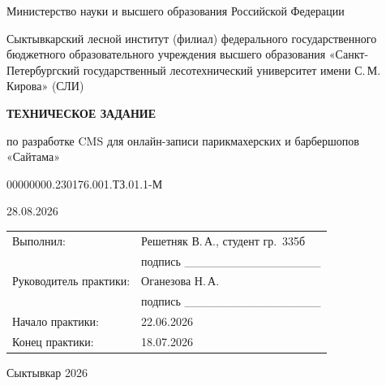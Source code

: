 



\begin{titlepage}
\centering
\vspace*{1cm}
{\large Министерство науки и высшего образования Российской Федерации\par}
\vspace{1.2em}
{\large Сыктывкарский лесной институт (филиал) федерального государственного
бюджетного образовательного учреждения высшего образования
«Санкт-Петербургский государственный лесотехнический университет
имени С.\,М.\,Кирова» (СЛИ)\par}
\vspace{3cm}
{\Huge\bfseries ТЕХНИЧЕСКОЕ ЗАДАНИЕ\par}
\vspace{1.2em}
{\large по разработке CMS для онлайн-записи парикмахерских и барбершопов «Сайтама»\par}
\vspace{1.5em}
00000000.230176.001.ТЗ.01.1-М\par
\vspace{0.3em}
28.08.2026\par
\vfill
\begin{tabular}{@{}p{5.5cm}p{7.5cm}@{}}
Выполнил: & Решетняк В.\,А., студент гр.\ 335б \\[2pt]
            & подпись \_\_\_\_\_\_\_\_\_\_\_\_\_\_\_\_ \\[14pt]
Руководитель практики: & Оганезова Н.\,А. \\[2pt]
            & подпись \_\_\_\_\_\_\_\_\_\_\_\_\_\_\_\_ \\[14pt]
Начало практики: & 22.06.2026 \\[2pt]
Конец практики: & 18.07.2026 \\
\end{tabular}
\vfill
Сыктывкар 2026\par
\vspace{1cm}
\end{titlepage}

